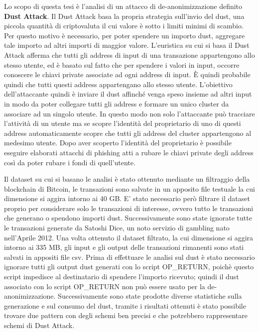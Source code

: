 Lo scopo di questa tesi è l'analisi di un attacco di de-anonimizzazione definito \textbf{Dust Attack}. Il Dust Attack basa la propria strategia sull'invio del dust, una piccola quantità di criptovaluta il cui valore è sotto i limiti minimi di scambio. Per questo motivo è necessario, per poter spendere un importo dust, aggregare tale importo ad altri importi di maggior valore. L'euristica su cui si basa il Dust Attack afferma che tutti gli address di input di una transazione appartengono allo stesso utente, ed è basato sul fatto che per spendere i valori in input, occorre conoscere le chiavi private associate ad ogni address di input. È quindi probabile quindi che tutti questi address appartengano allo stesso utente. L'obiettivo dell'attaccante quindi è inviare il dust affinché venga speso insieme ad altri input in modo da poter collegare tutti gli address e formare un unico cluster da associare ad un singolo utente. In questo modo non solo l'attaccante può tracciare l'attività di un utente ma se scopre l'identità del proprietario di uno di questi address automaticamente scopre che tutti gli address del cluster appartengono al medesimo utente. Dopo aver scoperto l'identità del proprietario è possibile eseguire elaborati attacchi di phishing atti a rubare le chiavi private degli address così da poter rubare i fondi di quell'utente.

Il dataset su cui si basano le analisi è stato ottenuto mediante un filtraggio della blockchain di Bitcoin, le transazioni sono salvate in un apposito file testuale la cui dimensione si aggira intorno ai 40 GB. E' stato necessario però filtrare il dataset proprio per considerare solo le transazioni di interesse, ovvero tutto le transazioni che generano o spendono importi dust. Successivamente sono state ignorate tutte le transazioni generate da Satoshi Dice, un noto servizio di gambling nato nell'Aprile 2012. Una volta ottenuto il dataset filtrato, la cui dimensione si aggira intorno ai 335 MB, gli input e gli output delle transazioni rimanenti sono stati salvati in appositi file csv. Prima di effettuare le analisi sul dust è stato necessario ignorare tutti gli output dust generati con lo script OP\_RETURN, poichè questo script impedisce al destinatario di spendere l'importo ricevuto; quindi il dust associato con lo script OP\_RETURN non può essere usato per la de-anonimizzazione. Successivamente sono state prodotte diverse statistiche sulla generazione e sul consumo del dust, tramite i risultati ottenuti è stato possibile trovare due pattern con degli schemi ben precisi e che potrebbero rappresentare schemi di Dust Attack.
 
